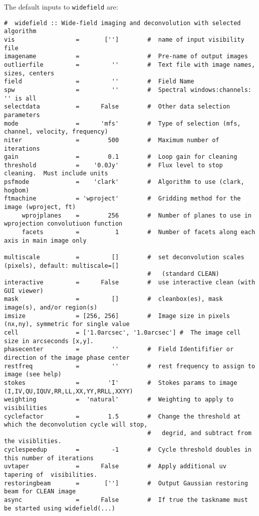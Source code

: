 \documentclass[11pt]{report}
\begin{document}
\medskip

The default inputs to {\tt widefield} are:
\scriptsize
\begin{verbatim}
#  widefield :: Wide-field imaging and deconvolution with selected algorithm
vis                 =       ['']        #  name of input visibility file
imagename           =                   #  Pre-name of output images
outlierfile         =         ''        #  Text file with image names, sizes, centers
field               =         ''        #  Field Name
spw                 =         ''        #  Spectral windows:channels: '' is all
selectdata          =      False        #  Other data selection parameters
mode                =      'mfs'        #  Type of selection (mfs, channel, velocity, frequency)
niter               =        500        #  Maximum number of iterations
gain                =        0.1        #  Loop gain for cleaning
threshold           =    '0.0Jy'        #  Flux level to stop cleaning.  Must include units
psfmode             =    'clark'        #  Algorithm to use (clark, hogbom)
ftmachine           = 'wproject'        #  Gridding method for the image (wproject, ft)
     wprojplanes    =        256        #  Number of planes to use in wprojection convolutiuon function
     facets         =          1        #  Number of facets along each axis in main image only

multiscale          =         []        #  set deconvolution scales (pixels), default: multiscale=[]
                                        #   (standard CLEAN)
interactive         =      False        #  use interactive clean (with GUI viewer)
mask                =         []        #  cleanbox(es), mask image(s), and/or region(s)
imsize              = [256, 256]        #  Image size in pixels (nx,ny), symmetric for single value
cell                = ['1.0arcsec', '1.0arcsec'] #  The image cell size in arcseconds [x,y].
phasecenter         =         ''        #  Field Identififier or direction of the image phase center
restfreq            =         ''        #  rest frequency to assign to image (see help)
stokes              =        'I'        #  Stokes params to image (I,IV,QU,IQUV,RR,LL,XX,YY,RRLL,XXYY)
weighting           =  'natural'        #  Weighting to apply to visibilities
cyclefactor         =        1.5        #  Change the threshold at which the deconvolution cycle will stop,
                                        #   degrid, and subtract from the visiblities.
cyclespeedup        =         -1        #  Cycle threshold doubles in this number of iterations
uvtaper             =      False        #  Apply additional uv tapering of  visibilities.
restoringbeam       =       ['']        #  Output Gaussian restoring beam for CLEAN image
async               =      False        #  If true the taskname must be started using widefield(...)
\end{verbatim}
\normalsize
\end{document}
